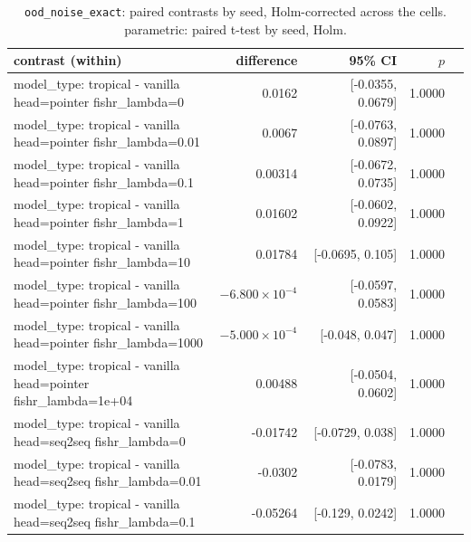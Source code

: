 \documentclass[10pt]{article}
\makeatletter
\newcommand{\stackcell}[1]{\begin{tabular}[t]{@{}l@{}}#1\end{tabular}}
\makeatother
\begin{document}
{\small
\begin{longtable}{lrrrl}
\caption{\texttt{ood\_noise\_exact}: paired contrasts by seed, Holm-corrected across the cells. parametric: paired t-test by seed, Holm.}\label{tab:paired-ood_noise_exact}\\
\toprule
contrast (within) & difference & 95\% CI & $p$ & \\
\midrule
\endhead
\stackcell{model\_type: tropical - vanilla\\\footnotesize head=pointer fishr\_lambda=0 } & 0.0162 & [-0.0355, 0.0679] & 1.0000 & \\
\stackcell{model\_type: tropical - vanilla\\\footnotesize head=pointer fishr\_lambda=0.01 } & 0.0067 & [-0.0763, 0.0897] & 1.0000 & \\
\stackcell{model\_type: tropical - vanilla\\\footnotesize head=pointer fishr\_lambda=0.1 } & 0.00314 & [-0.0672, 0.0735] & 1.0000 & \\
\stackcell{model\_type: tropical - vanilla\\\footnotesize head=pointer fishr\_lambda=1 } & 0.01602 & [-0.0602, 0.0922] & 1.0000 & \\
\stackcell{model\_type: tropical - vanilla\\\footnotesize head=pointer fishr\_lambda=10 } & 0.01784 & [-0.0695, 0.105] & 1.0000 & \\
\stackcell{model\_type: tropical - vanilla\\\footnotesize head=pointer fishr\_lambda=100 } & $-6.800\times10^{-4}$ & [-0.0597, 0.0583] & 1.0000 & \\
\stackcell{model\_type: tropical - vanilla\\\footnotesize head=pointer fishr\_lambda=1000 } & $-5.000\times10^{-4}$ & [-0.048, 0.047] & 1.0000 & \\
\stackcell{model\_type: tropical - vanilla\\\footnotesize head=pointer fishr\_lambda=1e+04 } & 0.00488 & [-0.0504, 0.0602] & 1.0000 & \\
\stackcell{model\_type: tropical - vanilla\\\footnotesize head=seq2seq fishr\_lambda=0 } & -0.01742 & [-0.0729, 0.038] & 1.0000 & \\
\stackcell{model\_type: tropical - vanilla\\\footnotesize head=seq2seq fishr\_lambda=0.01 } & -0.0302 & [-0.0783, 0.0179] & 1.0000 & \\
\stackcell{model\_type: tropical - vanilla\\\footnotesize head=seq2seq fishr\_lambda=0.1 } & -0.05264 & [-0.129, 0.0242] & 1.0000 & \\

\end{longtable}}
\end{document}
